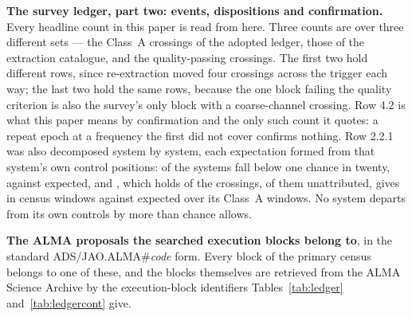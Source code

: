 \begin{table}
\centering
\scriptsize
\caption{\textbf{The survey ledger, part two: events, dispositions and
confirmation.} Every headline count in this paper is read from here. Three
counts are \MtCrossA{} over three different sets --- the Class~A crossings of
the adopted ledger, those of the extraction catalogue, and the
quality-passing crossings. The first two hold different rows, since re-extraction moved four
crossings across the trigger each way; the last two hold the same rows,
because the one block failing the quality criterion is also the survey's only
block with a coarse-channel crossing. Row 4.2 is what this
paper means by confirmation and the only such count it quotes: a repeat epoch
at a frequency the first did not cover confirms nothing. Row 2.2.1 was also
decomposed system by system, each expectation formed from that system's own
control positions: \MtNSysLowP{} of the \MtNSysChance{} systems fall below
one chance in twenty, against \MtNSysLowPExp{} expected, and \MtTopStar,
which holds \MtTopStarNCross{} of the \EvNCrossRaw{} crossings,
\MtTopStarNUnattr{} of them unattributed, gives \MtTopSysObs{} in census
windows against \MtTopSysExp{} expected over its \MtTopSysNWin{} Class~A
windows. No system
departs from its own controls by more than chance allows.}
\label{tab:counts}

\end{table}


\begin{table}
\centering
\scriptsize
\caption{\textbf{The \NProjCodes{} ALMA proposals the searched execution
blocks belong to}, in the standard
\mbox{ADS/JAO.ALMA\#\textit{code}} form. Every block of the primary census
belongs to one of these, and the blocks themselves are retrieved from the
ALMA Science Archive by the execution-block identifiers
Tables~\ref{tab:ledger} and~\ref{tab:ledgercont}
give.\ProjCodeUnresClause}
\label{tab:projcodes}

\end{table}
